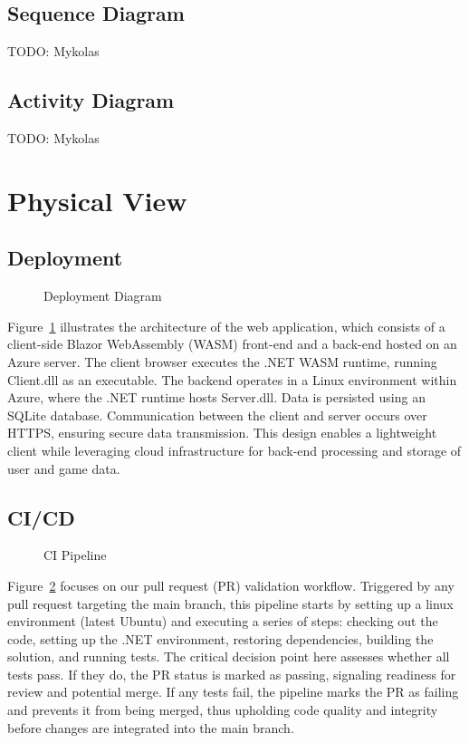 \documentclass[11pt,a4paper]{article}
\newcommand{\inputdiagram}[1]{}
\newcommand{\textwidthdiagram}[2][1]{%
  \resizebox{#1\textwidth}{!}{\inputdiagram{#2}}%
}
\begin{document}
\subsection{Sequence Diagram}
TODO: Mykolas
\subsection{Activity Diagram}
TODO: Mykolas

\section{Physical View}
\subsection{Deployment}
\begin{figure}[H]
    \centering
    \textwidthdiagram[0.8]{deployment_diagram.tex}
    \caption{Deployment Diagram}
    \label{fig:deployment_diagram}
\end{figure}

Figure~\ref{fig:deployment_diagram} illustrates the architecture of the web application,
which consists of a client-side Blazor WebAssembly (WASM) front-end and a back-end hosted on an Azure server. The client browser executes the .NET WASM
runtime, running Client.dll as an executable. The backend operates in a Linux
environment within Azure, where the .NET runtime hosts Server.dll. Data is
persisted using an SQLite database. Communication between the client and
server occurs over HTTPS, ensuring secure data transmission. This design
enables a lightweight client while leveraging cloud infrastructure for
back-end processing and storage of user and game data.

\subsection{CI/CD}

\begin{figure}[H]
        \centering
        \textwidthdiagram[0.8]{CI.tex}
        \caption{CI Pipeline}
        \label{fig:CI_pipeline}
\end{figure}
Figure~\ref{fig:CI_pipeline} focuses on our pull request (PR) validation
workflow. Triggered by any pull request targeting the main branch, this
pipeline starts by setting up a linux environment (latest Ubuntu) and
executing a series of steps: checking out the code, setting up the .NET
environment, restoring dependencies, building the solution, and running
tests. The critical decision point here assesses whether all tests pass. If
they do, the PR status is marked as passing, signaling readiness for review
and potential merge. If any tests fail, the pipeline marks the PR as failing
and prevents it from being merged, thus upholding code quality and integrity
before changes are integrated into the main branch.
\end{document}
